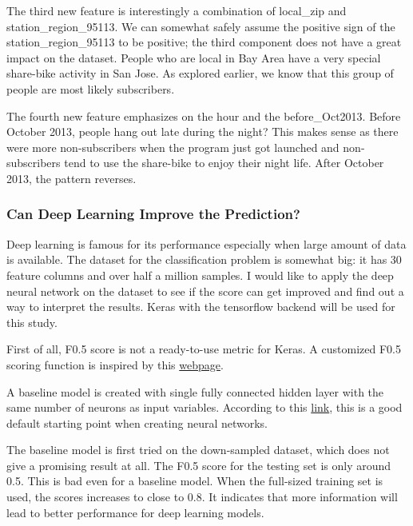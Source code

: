 \documentclass[a4paper]{article}
\begin{document}
			The third new feature is interestingly a combination of local\_zip and station\_region\_95113. We can somewhat safely assume the positive sign of the station\_region\_95113 to be positive; the third component does not have a great impact on the dataset. People who are local in Bay Area have a very special share-bike activity in San Jose. As explored earlier, we know that this group of people are most likely subscribers.
			
			The fourth new feature emphasizes on the hour and the before\_Oct2013. Before October 2013, people hang out late during the night? This makes sense as there were more non-subscribers when the program just got launched and non-subscribers tend to use the share-bike to enjoy their night life. After October 2013, the pattern reverses.
		
			\subsubsection{Can Deep Learning Improve the Prediction?}			
			
			Deep learning is famous for its performance especially when large amount of data is available. The dataset for the classification problem is somewhat big: it has 30 feature columns and over half a million samples. I would like to apply the deep neural network on the dataset to see if the score can get improved and find out a way to interpret the results. Keras with the tensorflow backend will be used for this study.

			First of all, F0.5 score is not a ready-to-use metric for Keras. A customized F0.5 scoring function is inspired by this \href{https://www.kaggle.com/arsenyinfo/f-beta-score-for-keras}{webpage}. 
			
			A baseline model is created with single fully connected hidden layer with the same number of neurons as input variables. According to this \href{https://machinelearningmastery.com/binary-classification-tutorial-with-the-keras-deep-learning-library/}{link}, this is a good default starting point when creating neural networks.
			
			The baseline model is first tried on the down-sampled dataset, which does not give a promising result at all. The F0.5 score for the testing set is only around 0.5. This is bad even for a baseline model. When the full-sized training set is used, the scores increases to close to 0.8. It indicates that more information will lead to better performance for deep learning models.
			
\end{document}
